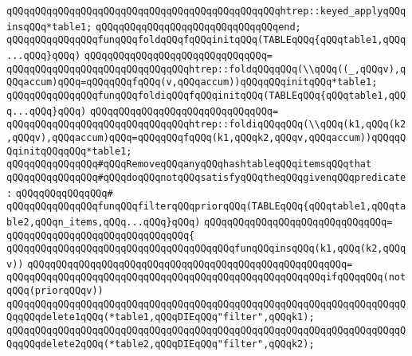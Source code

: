 \verb|qQQqqQQqqQQqqQQqqQQqqQQqqQQqqQQqqQQqqQQqqQQqqQQqhtrep::keyed_applyqQQqinsqQQq*table1;|\newline
\verb|qQQqqQQqqQQqqQQqqQQqqQQqqQQqqQQqend;|\newline
\newline
\verb|qQQqqQQqqQQqqQQqfunqQQqfoldqQQqfqQQqinitqQQq(TABLEqQQq{qQQqtable1,qQQq...qQQq}qQQq)|\newline
\verb|qQQqqQQqqQQqqQQqqQQqqQQqqQQqqQQq=|\newline
\verb|qQQqqQQqqQQqqQQqqQQqqQQqqQQqqQQqhtrep::foldqQQqqQQq(\\qQQq((_,qQQqv),qQQqaccum)qQQq=qQQqqQQqfqQQq(v,qQQqaccum))qQQqqQQqinitqQQq*table1;|\newline
\newline
\verb|qQQqqQQqqQQqqQQqfunqQQqfoldiqQQqfqQQqinitqQQq(TABLEqQQq{qQQqtable1,qQQq...qQQq}qQQq)|\newline
\verb|qQQqqQQqqQQqqQQqqQQqqQQqqQQqqQQq=|\newline
\verb|qQQqqQQqqQQqqQQqqQQqqQQqqQQqqQQqhtrep::foldiqQQqqQQq(\\qQQq(k1,qQQq(k2,qQQqv),qQQqaccum)qQQq=qQQqqQQqfqQQq(k1,qQQqk2,qQQqv,qQQqaccum))qQQqqQQqinitqQQqqQQq*table1;|\newline
\newline
\verb|qQQqqQQqqQQqqQQq#qQQqRemoveqQQqanyqQQqhashtableqQQqitemsqQQqthat|\newline
\verb|qQQqqQQqqQQqqQQq#qQQqdoqQQqnotqQQqsatisfyqQQqtheqQQqgivenqQQqpredicate:|\newline
\verb|qQQqqQQqqQQqqQQq#|\newline
\verb|qQQqqQQqqQQqqQQqfunqQQqfilterqQQqpriorqQQq(TABLEqQQq{qQQqtable1,qQQqtable2,qQQqn_items,qQQq...qQQq}qQQq)|\newline
\verb|qQQqqQQqqQQqqQQqqQQqqQQqqQQqqQQq=|\newline
\verb|qQQqqQQqqQQqqQQqqQQqqQQqqQQqqQQq{|\newline
\verb|qQQqqQQqqQQqqQQqqQQqqQQqqQQqqQQqqQQqqQQqfunqQQqinsqQQq(k1,qQQq(k2,qQQqv))|\newline
\verb|qQQqqQQqqQQqqQQqqQQqqQQqqQQqqQQqqQQqqQQqqQQqqQQqqQQqqQQq=|\newline
\verb|qQQqqQQqqQQqqQQqqQQqqQQqqQQqqQQqqQQqqQQqqQQqqQQqqQQqqQQqifqQQqqQQq(notqQQq(priorqQQqv))|\newline
\verb|qQQqqQQqqQQqqQQqqQQqqQQqqQQqqQQqqQQqqQQqqQQqqQQqqQQqqQQqqQQqqQQqqQQqqQQqqQQqdelete1qQQq(*table1,qQQqDIEqQQq"filter",qQQqk1);|\newline
\verb|qQQqqQQqqQQqqQQqqQQqqQQqqQQqqQQqqQQqqQQqqQQqqQQqqQQqqQQqqQQqqQQqqQQqqQQqqQQqdelete2qQQq(*table2,qQQqDIEqQQq"filter",qQQqk2);|\newline
